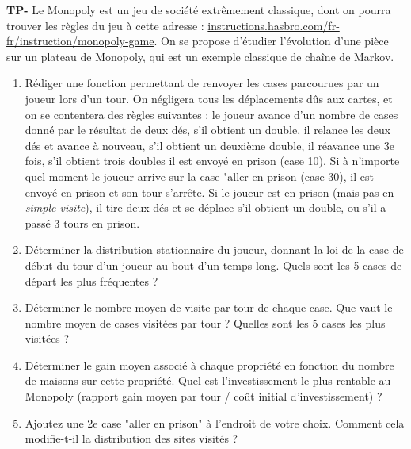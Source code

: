 \documentclass[]{exercices}
\begin{document}
\begin{exercice}
\textbf{TP-}
Le Monopoly est un jeu de société extrêmement classique, dont on pourra trouver les règles du jeu à cette adresse : \href{https://instructions.hasbro.com/api/download/C1009_fr-fr_monopoly-game.pdf}{instructions.hasbro.com/fr-fr/instruction/monopoly-game}. On se propose d'étudier l'évolution d'une pièce sur un plateau de Monopoly, qui est un exemple classique de chaîne de Markov.
\begin{enumerate}
  \item Rédiger une fonction permettant de renvoyer les cases parcourues par un joueur lors d'un tour. On négligera tous les déplacements dûs aux cartes, et on se contentera des règles suivantes : le joueur avance d'un nombre de cases donné par le résultat de deux dés, s'il obtient un double, il relance les deux dés et avance à nouveau, s'il obtient un deuxième double, il réavance une 3e fois, s'il obtient trois doubles il est envoyé en prison (case 10). Si à n'importe quel moment le joueur arrive sur la case "aller en prison (case 30), il est envoyé en prison et son tour s'arrête. Si le joueur est en prison (mais pas en \emph{simple visite}), il tire deux dés et se déplace s'il obtient un double, ou s'il a passé 3 tours en prison.
  \item Déterminer la distribution stationnaire du joueur, donnant la loi de la case de début du tour d'un joueur au bout d'un temps long. Quels sont les 5 cases de départ les plus fréquentes ?
  \item Déterminer le nombre moyen de visite par tour de chaque case. Que vaut le nombre moyen de cases visitées par tour ? Quelles sont les 5 cases les plus visitées ?
  \item Déterminer le gain moyen associé à chaque propriété en fonction du nombre de maisons sur cette propriété. Quel est l'investissement le plus rentable au Monopoly (rapport gain moyen par tour / coût initial d'investissement) ?
  \item Ajoutez une 2e case "aller en prison" à l'endroit de votre choix. Comment cela modifie-t-il la distribution des sites visités ?
\end{enumerate}
\end{exercice}
\end{document}
